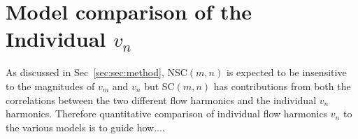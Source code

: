 \appendix
\section{Model comparison of the Individual $v_n$}

As discussed in Sec~\ref{sec:sec:method}, NSC$(m,n)$ is expected to be insensitive to the magnitudes of $v_{m}$ and $v_{n}$ but SC$(m,n)$ has contributions from both the correlations between the two different flow harmonics and the individual $v_{n}$ harmonics.
Therefore quantitative comparison of individual flow harmonics $v_n$ to the various models is to guide how....
\begin{figure}[h]
            \begin{center}

\end{center}
\end{figure}
